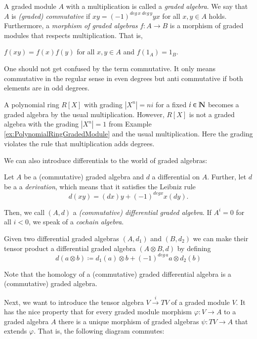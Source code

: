 \begin{Definition}
 A graded module $A$ with a multiplication is called a \emph{graded algebra}. We say that $A$ is \emph{(graded) commutative} if
 $xy = (-1)^{deg \, x \; deg \, y} yx$ for all $x,y \in A$ holds. Furthermore, a \emph{morphism of graded algebras} 
 $f \colon A \to B$ is a morphism of graded modules that respects multiplication. That is, 

 \centerline{$f(xy) = f(x)f(y)$ for all $x,y \in A$ and $f(1_A) = 1_B$.} 
 
\end{Definition}

One should not get confused by the term commutative. It only means commutative in the regular sense in even degrees but
anti commutative if both elements are in odd degrees.

\begin{Example}
 A polynomial ring $R[X]$ with grading $|X^n| = n i$ for a fixed $i \in \mathbb{N}$ becomes a graded algebra by the usual multiplication.
 However, $R[X]$ is not a graded algebra with the grading $|X^n| = 1$ from Example \ref{ex:PolynomialRingGradedModule} and the usual
 multiplication. Here the grading violates the rule that multiplication adds degrees.
\end{Example}


We can also introduce differentials to the world of graded algebras:
\begin{Definition}
 Let $A$ be a (commutative) graded algebra and $d$ a differential on $A$. Further, let $d$ be a
 a \emph{derivation}, which means that it satisfies the Leibniz rule 
 $$ d(xy) = (dx)y + (-1)^{deg x} x(dy).$$
 
 Then, we call $(A,d)$ a \emph{(commutative) differential graded algebra}. If $A^i = 0$ for all $i < 0$, we
 speak of a \emph{cochain algebra}. 
 
 Given two differential graded algebras $(A,d_1)$ and $(B, d_2)$ we can make their tensor product a 
 differential graded algebra $(A \otimes B, d)$ by defining 
 $$ d(a \otimes b) \coloneqq d_1(a) \otimes b + (-1)^{deg \, a} a \otimes d_2(b)$$
\end{Definition}

Note that the homology of a (commutative) graded differential algebra is a (commutative) graded algebra. 

Next, we want to introduce the tensor algebra $V \overset{i}{\to} TV$ of a graded module $V$. It has the nice property
that for every graded module morphism $\varphi \colon V \to A$ to a graded algebra $A$ there is a unique 
 morphism of graded algebras $\psi \colon TV \to A$ that extends $\varphi$. That is, the following diagram commutes:

